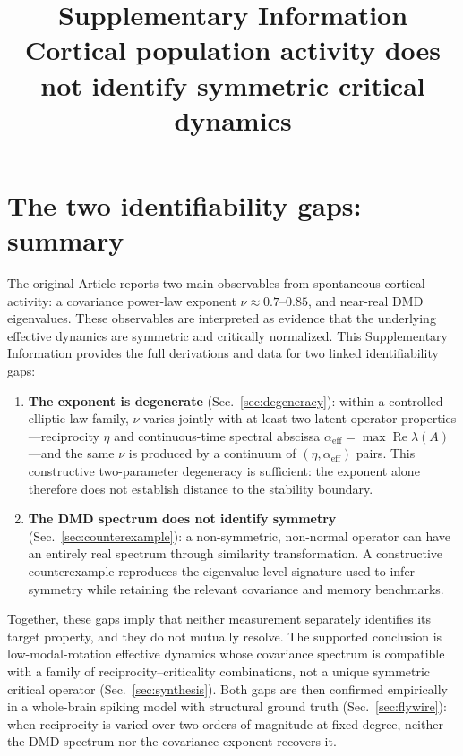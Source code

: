 \documentclass[11pt]{article}
\title{Supplementary Information\\[4pt]
\large Cortical population activity does not identify symmetric critical
dynamics}
\author{}
\date{}
\newcommand{\alphaeff}{\alpha_{\mathrm{eff}}}
\begin{document}
\maketitle
\vspace{-3em}

\tableofcontents
\bigskip

\section{The two identifiability gaps: summary}
\label{sec:summary}

The original Article\cite{pachitariu2026} reports two main observables from
spontaneous cortical activity: a covariance power-law exponent
$\nu\approx 0.7$--$0.85$, and near-real DMD eigenvalues. These observables are
interpreted as evidence that the underlying effective dynamics are symmetric and
critically normalized. This Supplementary Information provides the full derivations and
data for two linked identifiability gaps:

\begin{enumerate}
  \item \textbf{The exponent is degenerate} (Sec.~\ref{sec:degeneracy}):
    within a controlled elliptic-law family, $\nu$ varies jointly with at least
    two latent operator properties---reciprocity $\eta$ and continuous-time spectral abscissa
    $\alphaeff=\max\operatorname{Re}\lambda(A)$---and the same $\nu$ is
    produced by a continuum of $(\eta,\alphaeff)$ pairs. This constructive
    two-parameter degeneracy is sufficient: the exponent alone
    therefore does not establish distance to the stability boundary.
  \item \textbf{The DMD spectrum does not identify symmetry}
    (Sec.~\ref{sec:counterexample}): a non-symmetric, non-normal operator can
    have an entirely real spectrum through similarity transformation. A
    constructive counterexample reproduces the eigenvalue-level signature used
    to infer symmetry while retaining the relevant covariance and memory
    benchmarks.
\end{enumerate}

Together, these gaps imply that neither measurement separately identifies its
target property, and they do not mutually resolve. The supported conclusion is
low-modal-rotation effective dynamics whose covariance spectrum is compatible
with a family of reciprocity--criticality combinations, not a unique symmetric
critical operator (Sec.~\ref{sec:synthesis}). Both gaps are then confirmed
empirically in a whole-brain spiking model with structural ground truth
(Sec.~\ref{sec:flywire}): when reciprocity is varied over two orders of magnitude
at fixed degree, neither the DMD spectrum nor the covariance exponent recovers
it.
\end{document}
